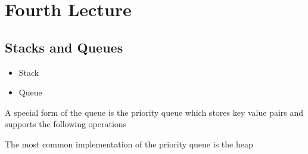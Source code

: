 \documentclass[a4paper]{article}
\begin{document}
\section{Fourth Lecture}
\subsection{Stacks and Queues}
\begin{itemize}
    \item Stack
    \item Queue
\end{itemize}
A special form of the queue is the priority queue which stores key value pairs and supports the following operations
The most common implementation of the priority queue is the heap
\end{document}

